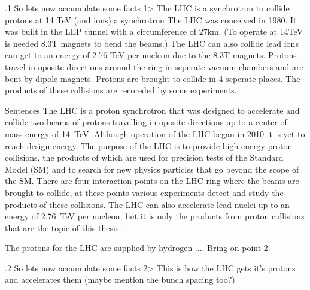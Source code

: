 .1
So lets now accumulate some facts 
1> The LHC is a synchrotron to collide protons at 14 TeV (and ions)
a synchrotron 
The LHC was conceived in 1980.
It was built in the LEP tunnel with a circumference of 27km. (To operate at 14TeV is needed 8.3T magnets to bend the beams.)
The LHC can also collide lead ions can get to an energy of 2.76 TeV per nucleon due to the 8.3T magnets.
Protons travel in oposite directions around the ring in seperate vacuum chambers and are bent by dipole magnets.
Protons are brought to collide in 4 seperate places.
The products of these collisions are recoreded by some experiments.

Sentences
The LHC is a proton synchrotron that was designed to accelerate and collide two beams of protons travelling in oposite directions up to a center-of-mass energy of 14~TeV. Although operation of the LHC began in 2010 it is yet to reach design energy. The purpose of the LHC is to provide high energy proton collisions, the products of which are used for precision tests of the Standard Model (SM) and to search for new physics particles that go beyond the scope of the SM. There are four interaction points on the LHC ring where the beams are brought to collide, at these points various experiments detect and study the products of these collisions. The LHC can also accelerate lead-nuclei up to an energy of 2.76~TeV per nucleon, but it is only the products from proton collisions that are the topic of this thesis.


The protons for the LHC are supplied by hydrogen .... Bring on point 2.

.2
So lets now accumulate some facts 
2> This is how the LHC gets it's protons and accelerates them (maybe mention the bunch spacing too?)

